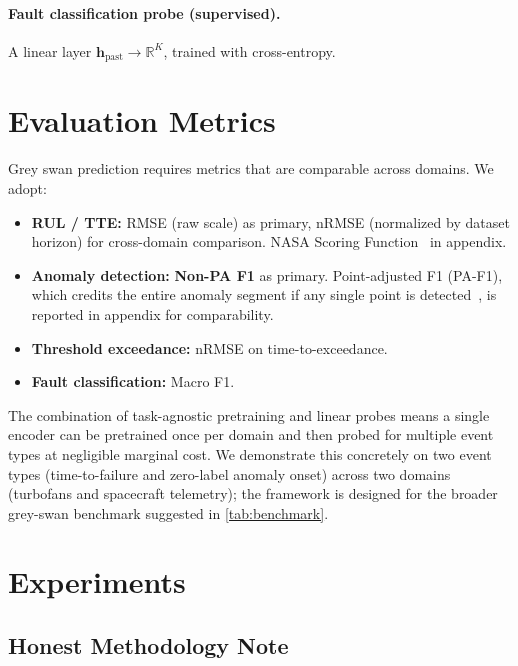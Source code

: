 \documentclass{article}
\newcommand{\R}{\mathbb{R}}
\newcommand{\h}{\mathbf{h}}
\begin{document}
\paragraph{Fault classification probe (supervised).} A linear layer $\h_\text{past} \to \R^K$, trained with cross-entropy.

\section{Evaluation Metrics}
\label{sec:metrics}

Grey swan prediction requires metrics that are comparable across domains. We adopt:

\begin{itemize}[nosep]
  \item \textbf{RUL / TTE:} RMSE (raw scale) as primary, nRMSE (normalized by dataset horizon) for cross-domain comparison. NASA Scoring Function~\citep{saxena2008cmapss} in appendix.
  \item \textbf{Anomaly detection:} \textbf{Non-PA F1} as primary. Point-adjusted F1 (PA-F1), which credits the entire anomaly segment if any single point is detected~\citep{schmidl2022tsadeval}, is reported in appendix for comparability.
  \item \textbf{Threshold exceedance:} nRMSE on time-to-exceedance.
  \item \textbf{Fault classification:} Macro F1.
\end{itemize}

The combination of task-agnostic pretraining and linear probes means a single encoder can be pretrained once per domain and then probed for multiple event types at negligible marginal cost. We demonstrate this concretely on two event types (time-to-failure and zero-label anomaly onset) across two domains (turbofans and spacecraft telemetry); the framework is designed for the broader grey-swan benchmark suggested in \cref{tab:benchmark}.

\section{Experiments}
\label{sec:experiments}

\subsection{Honest Methodology Note}
\label{sec:methodology_note}
\end{document}
